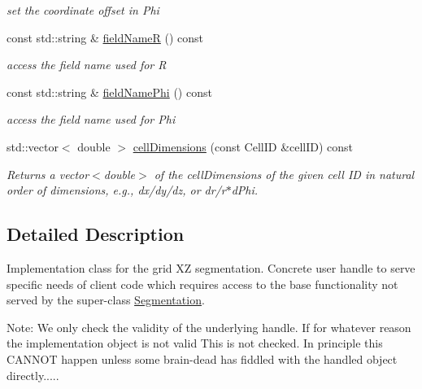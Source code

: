 \begin{DoxyCompactItemize}
\begin{DoxyCompactList}\small\item\em set the coordinate offset in Phi \item\end{DoxyCompactList}\item 
const std::string \& \hyperlink{class_d_d4hep_1_1_geometry_1_1_polar_grid_r_phi_a1d88df579d6642d27b5ee7ee16a946f4}{fieldNameR} () const 
\begin{DoxyCompactList}\small\item\em access the field name used for R \item\end{DoxyCompactList}\item 
const std::string \& \hyperlink{class_d_d4hep_1_1_geometry_1_1_polar_grid_r_phi_a2492901ca52f27c791de76f796c9665b}{fieldNamePhi} () const 
\begin{DoxyCompactList}\small\item\em access the field name used for Phi \item\end{DoxyCompactList}\item 
std::vector$<$ double $>$ \hyperlink{class_d_d4hep_1_1_geometry_1_1_polar_grid_r_phi_ab83e8e400d9232d766693ea7f52b6fb6}{cellDimensions} (const CellID \&cellID) const 
\begin{DoxyCompactList}\small\item\em Returns a vector$<$double$>$ of the cellDimensions of the given cell ID in natural order of dimensions, e.g., dx/dy/dz, or dr/r$\ast$dPhi. \item\end{DoxyCompactList}\end{DoxyCompactItemize}


\subsection{Detailed Description}
Implementation class for the grid XZ segmentation. Concrete user handle to serve specific needs of client code which requires access to the base functionality not served by the super-\/class \hyperlink{class_d_d4hep_1_1_geometry_1_1_segmentation}{Segmentation}.

Note: We only check the validity of the underlying handle. If for whatever reason the implementation object is not valid This is not checked. In principle this CANNOT happen unless some brain-\/dead has fiddled with the handled object directly.....

